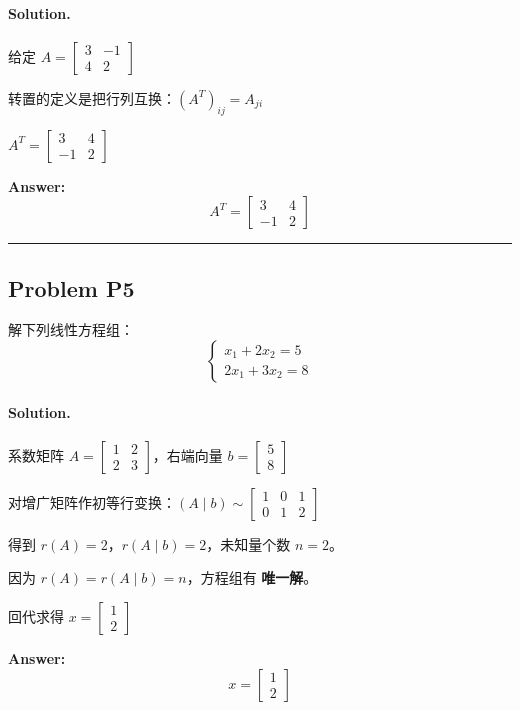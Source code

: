 \documentclass[12pt, a4paper]{article}
\newcommand{\problem}[1]{\subsection*{Problem #1}}
\newcommand{\solution}{\paragraph{Solution.}}
\begin{document}
\solution


给定 $A = \left[\begin{matrix}3 & -1\\4 & 2\end{matrix}\right]$

转置的定义是把行列互换：$(A^T)_{ij} = A_{ji}$

$A^T = \left[\begin{matrix}3 & 4\\-1 & 2\end{matrix}\right]$

\textbf{Answer:}
\[A^T = \left[\begin{matrix}3 & 4\\-1 & 2\end{matrix}\right]\]

\vspace{1em}
\hrule
\vspace{1em}

\problem{P5}

解下列线性方程组：
   $$\begin{cases}
   x_1 + 2x_2 = 5 \\
   2x_1 + 3x_2 = 8
   \end{cases}$$

\solution


系数矩阵 $A = \left[\begin{matrix}1 & 2\\2 & 3\end{matrix}\right]$，右端向量 $b = \left[\begin{matrix}5\\8\end{matrix}\right]$

对增广矩阵作初等行变换：$(A\mid b) \sim \left[\begin{matrix}1 & 0 & 1\\0 & 1 & 2\end{matrix}\right]$

得到 $r(A) = 2$，$r(A\mid b) = 2$，未知量个数 $n = 2$。

因为 $r(A) = r(A\mid b) = n$，方程组有 \textbf{唯一解}。

回代求得 $x = \left[\begin{matrix}1\\2\end{matrix}\right]$

\textbf{Answer:}
\[x = \left[\begin{matrix}1\\2\end{matrix}\right]\]
\end{document}
